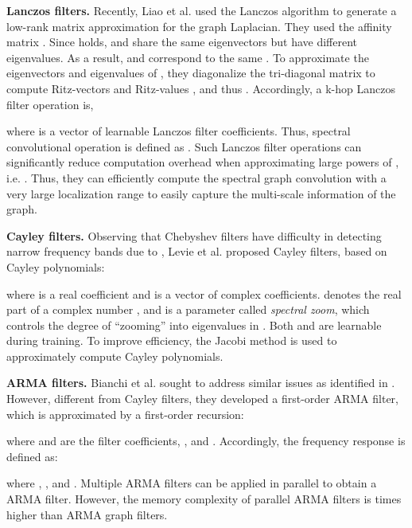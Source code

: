 \documentclass{article}
\begin{document}
\smallskip
\textbf{Lanczos filters. } Recently, Liao et al. \cite{liao2019lanczosnet} used the Lanczos algorithm to generate a low-rank matrix approximation  for the graph Laplacian. They used the affinity matrix . Since  holds,  and  share the same eigenvectors but have different eigenvalues. As a result,  and  correspond to the same . To approximate the eigenvectors and eigenvalues of , they diagonalize the tri-diagonal matrix  to compute Ritz-vectors  and Ritz-values , and thus . Accordingly, a k-hop Lanczos filter operation is,


where  is a vector of learnable Lanczos filter coefficients. Thus, spectral convolutional operation is defined as . Such Lanczos filter operations can significantly reduce computation overhead when approximating large powers of , i.e. . Thus, they can efficiently compute the spectral graph convolution with a very large localization range to easily capture the multi-scale information of the graph.














\smallskip
\textbf{Cayley filters.  } Observing that Chebyshev filters have difficulty in detecting narrow frequency bands due to , Levie et al. \cite{levie2017cayleynets} proposed Cayley filters, based on Cayley polynomials:
 
where  is a real coefficient and  is a vector of complex coefficients.  denotes the real part of a complex number , and  is a parameter called \emph{spectral zoom}, which controls the degree of ``zooming'' into eigenvalues in . Both  and  are learnable during training. To improve efficiency, the Jacobi method is used to approximately compute Cayley polynomials. 

\smallskip
\textbf{ARMA filters. } Bianchi et al. \cite{bianchi2019graph} sought to address similar issues as identified in \cite{levie2017cayleynets}. However, different from Cayley filters, they developed a first-order ARMA filter, which is approximated by a first-order recursion:

where  and  are the filter coefficients, , and . Accordingly, the frequency response is defined as:

where , , and  \cite{isufi2017autoregressive1}. Multiple ARMA filters can be applied in parallel to obtain a ARMA filter. However, the memory complexity of  parallel ARMA filters is  times higher than ARMA graph filters. \begin{comment}

where  denotes the spectral decomposition of .
\end{comment}
\end{document}
